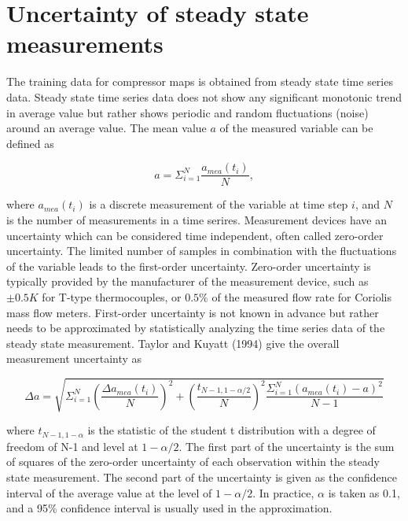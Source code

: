 \section{Uncertainty of steady state measurements}
\label{sec:unc_steady}
The training data for compressor maps is obtained from steady state time series data. Steady state time series data does not show any significant monotonic trend in average value but rather shows periodic and random fluctuations (noise) around an average value. The mean value $a$ of the measured variable can be defined as

\begin{equation}
a = \Sigma _{i = 1}^N{\frac{{{a_{mea}}({t_i})}}{N}},
\label{eq:avg_mea}
\end{equation}

where $a_{mea}(t_i)$ is a discrete measurement of the variable at time step $i$, and $N$ is the number of measurements in a time serires. Measurement devices have an uncertainty which can be considered time independent, often called zero-order uncertainty. The limited number of samples in combination with the fluctuations of the variable leads to the first-order uncertainty.  Zero-order uncertainty is typically provided by the manufacturer of the measurement device, such as $\pm0.5K$ for T-type thermocouples, or $0.5\%$ of the measured flow rate for Coriolis mass flow meters. First-order uncertainty is not known in advance but rather needs to be approximated by statistically analyzing the time series data of the steady state measurement. Taylor and Kuyatt (1994)\cite{Kamei:1995} give the overall measurement uncertainty as

\begin{equation}
\Delta a = \sqrt {\Sigma _{i = 1}^N{{\left(\frac{{\Delta {a_{mea}}({t_i})}}{N}\right)}^2} + {{\left(\frac{{{t_{N - 1,1 - \alpha /2}}}}{N}\right)}^2}\frac{{\Sigma _{i = 1}^N{{\left({a_{mea}}({t_i}) - a\right)}^2}}}{{N - 1}}} 
\label{eq:mea_unc_TK}
\end{equation}

where $t_{N-1,1-\alpha}$ is the statistic of the student t distribution with a degree of freedom of N-1 and level at $1-\alpha/2$. The first part of the uncertainty is the sum of squares of the zero-order uncertainty of each observation within the steady state measurement. The second part of the uncertainty is given as the confidence interval of the average value at the level of $1-\alpha/2$. In practice, $\alpha$ is taken as 0.1, and a 95\% confidence interval is usually used in the approximation.